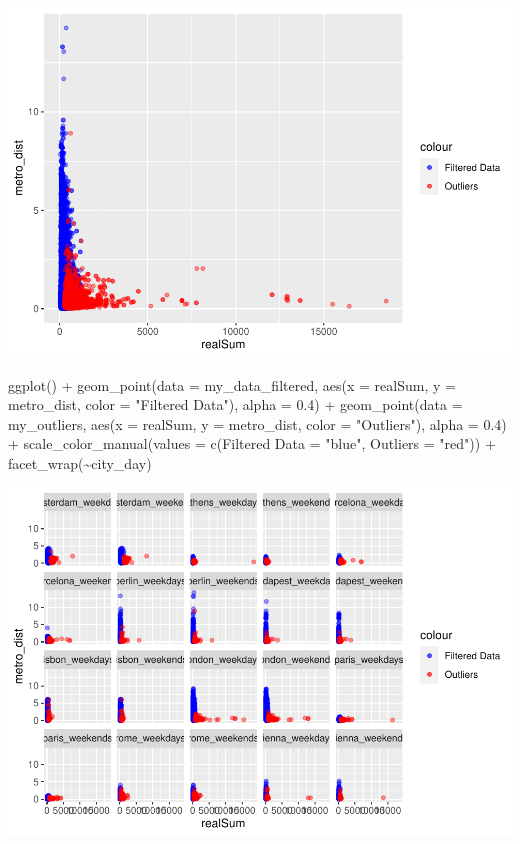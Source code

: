 \documentclass[
]{article}
\newenvironment{Shaded}{\begin{snugshade}}{\end{snugshade}}
\newcommand{\AttributeTok}[1]{\textcolor[rgb]{0.77,0.63,0.00}{#1}}
\newcommand{\FloatTok}[1]{\textcolor[rgb]{0.00,0.00,0.81}{#1}}
\newcommand{\FunctionTok}[1]{\textcolor[rgb]{0.00,0.00,0.00}{#1}}
\newcommand{\NormalTok}[1]{#1}
\newcommand{\OtherTok}[1]{\textcolor[rgb]{0.56,0.35,0.01}{#1}}
\newcommand{\SpecialCharTok}[1]{\textcolor[rgb]{0.00,0.00,0.00}{#1}}
\newcommand{\StringTok}[1]{\textcolor[rgb]{0.31,0.60,0.02}{#1}}
\begin{document}
\includegraphics{Project_files/figure-latex/unnamed-chunk-15-1.pdf}

\begin{Shaded}
\begin{Highlighting}[]
\FunctionTok{ggplot}\NormalTok{() }\SpecialCharTok{+} \FunctionTok{geom\_point}\NormalTok{(}\AttributeTok{data =}\NormalTok{ my\_data\_filtered, }\FunctionTok{aes}\NormalTok{(}\AttributeTok{x =}\NormalTok{ realSum,}
    \AttributeTok{y =}\NormalTok{ metro\_dist, }\AttributeTok{color =} \StringTok{"Filtered Data"}\NormalTok{), }\AttributeTok{alpha =} \FloatTok{0.4}\NormalTok{) }\SpecialCharTok{+}
    \FunctionTok{geom\_point}\NormalTok{(}\AttributeTok{data =}\NormalTok{ my\_outliers, }\FunctionTok{aes}\NormalTok{(}\AttributeTok{x =}\NormalTok{ realSum, }\AttributeTok{y =}\NormalTok{ metro\_dist,}
        \AttributeTok{color =} \StringTok{"Outliers"}\NormalTok{), }\AttributeTok{alpha =} \FloatTok{0.4}\NormalTok{) }\SpecialCharTok{+} \FunctionTok{scale\_color\_manual}\NormalTok{(}\AttributeTok{values =} \FunctionTok{c}\NormalTok{(}\StringTok{\textasciigrave{}}\AttributeTok{Filtered Data}\StringTok{\textasciigrave{}} \OtherTok{=} \StringTok{"blue"}\NormalTok{,}
    \AttributeTok{Outliers =} \StringTok{"red"}\NormalTok{)) }\SpecialCharTok{+} \FunctionTok{facet\_wrap}\NormalTok{(}\SpecialCharTok{\textasciitilde{}}\NormalTok{city\_day)}
\end{Highlighting}
\end{Shaded}

\includegraphics{Project_files/figure-latex/unnamed-chunk-15-2.pdf}
\end{document}
